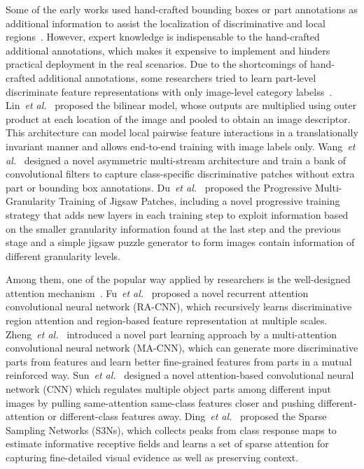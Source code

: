 \documentclass[journal]{IEEEtran}
\begin{document}
Some of the early works used hand-crafted bounding boxes or part annotations as additional information to assist the localization of discriminative and local regions~\cite{berg2013poof, xie2013hierarchical, branson2014bird, lei2016fast, li2019dual, ma2019fine}. However, expert knowledge is indispensable to the hand-crafted additional annotations, which makes it expensive to implement and hinders practical deployment in the real scenarios. Due to the shortcomings of hand-crafted additional annotations, some researchers tried to learn part-level discriminate feature representations with only image-level category labelss~\cite{dubey2018pairwise, lin2015bilinear, peng2017object,chang2020mc, wang2018learning,sun2018multi,luo2019cross,du2020fine}. Lin~\emph{et al.}~\cite{lin2015bilinear} proposed the bilinear model, whose outputs are multiplied using outer product at each location of the image and pooled to obtain an image descriptor. This architecture can model local pairwise feature interactions in a translationally invariant manner and allows end-to-end training with image labels only. Wang~\emph{et al.}~\cite{wang2018learning} designed a novel asymmetric multi-stream architecture and train a bank of convolutional filters to capture class-specific discriminative patches without extra part or bounding box annotations. Du~\emph{et al.}~\cite{du2020fine} proposed the Progressive Multi-Granularity Training of Jigsaw Patches, including a novel progressive training strategy that adds new layers in each training step to exploit information based on the smaller granularity information found at the last step and the previous stage and a simple jigsaw puzzle generator to form images contain information of different granularity levels.

Among them, one of the popular way applied by researchers is the well-designed attention mechanism~\cite{liu2020filtration,zheng2017learning,zhang2019learning,zheng2019looking,ji2020attention}. Fu~\emph{et al.}~\cite{fu2017look} proposed a novel recurrent attention convolutional neural network (RA-CNN), which recursively learns discriminative region attention and region-based feature representation at multiple scales. Zheng~\emph{et al.}~\cite{zheng2017learning} introduced a novel part learning approach by a multi-attention convolutional neural network (MA-CNN), which can generate more discriminative parts from features and learn better fine-grained features from parts in a mutual reinforced way. Sun~\emph{et al.}~\cite{sun2018multi} designed a novel attention-based convolutional neural network (CNN) which regulates multiple object parts among different input images by pulling same-attention same-class features closer and pushing different-attention or different-class features away. Ding~\emph{et al.}~\cite{ding2019selective} proposed the Sparse Sampling Networks (S3Ns), which collects peaks from class response maps to estimate informative receptive fields and learns a set of sparse attention for capturing fine-detailed visual evidence as well as preserving context.
\end{document}
